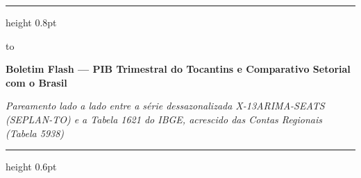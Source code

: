 \documentclass[10pt,a4paper]{article}
\begin{document}
\color{cinzatexto}

%
\par\vspace{2pt}%
{\color{douradoto}\hrule height 0.8pt}%
\par\vspace{6pt}%
\noindent\hbox to %
\par\vspace{5pt}%
{\fontsize{14.5}{17.4}\selectfont\bfseries\color{corprimaria}Boletim Flash — PIB Trimestral do Tocantins e Comparativo Setorial com o Brasil\par}%
\vspace{3pt}%
{\footnotesize\itshape\color{cinzasub}Pareamento lado a lado entre a série dessazonalizada X-13ARIMA-SEATS (SEPLAN-TO) e a Tabela 1621 do IBGE, acrescido das Contas Regionais (Tabela 5938)\par}%
\par\vspace{6pt}%
{\color{cinzaborda}\hrule height 0.6pt}%

\vspace{0.14cm}
\end{document}
